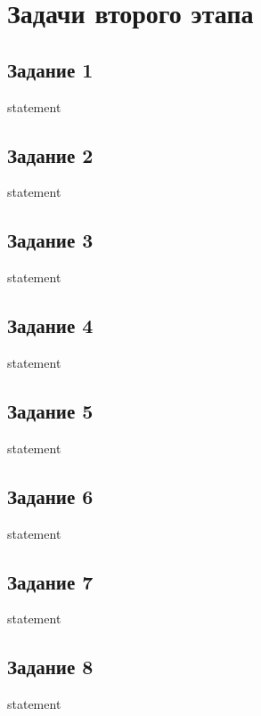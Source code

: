 \chapter{Задачи второго этапа}

%
\section{Задание 1}

{statement}

\section{Задание 2}

{statement}

\section{Задание 3}

{statement}

\section{Задание 4}

{statement}

\section{Задание 5}

{statement}

\section{Задание 6}

{statement}

\section{Задание 7}

{statement}

\section{Задание 8}

{statement}
